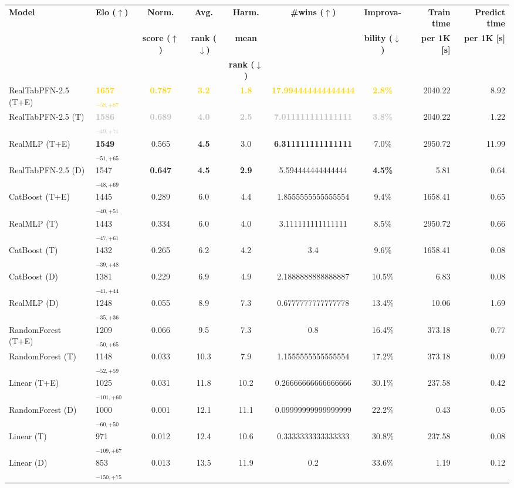 \begin{tabular}{llcccccrr}
\toprule
\textbf{Model} & \textbf{Elo ($\uparrow$)} & \textbf{Norm.} & \textbf{Avg.} & \textbf{Harm.} & \textbf{\#wins ($\uparrow$)} & \textbf{Improva-} & \textbf{Train time} & \textbf{Predict time} \\
 &  & \textbf{score ($\uparrow$)} & \textbf{rank ($\downarrow$)} & \textbf{mean} &  & \textbf{bility ($\downarrow$)} & \textbf{per 1K [s]} & \textbf{per 1K [s]} \\
 &  &  &  & \textbf{rank ($\downarrow$)} &  &  &  &  \\
\midrule
RealTabPFN-2.5 (T+E) & \textcolor{gold}{\textbf{1657${}_{-58,+87}$}} & \textcolor{gold}{\textbf{0.787}} & \textcolor{gold}{\textbf{3.2}} & \textcolor{gold}{\textbf{1.8}} & \textcolor{gold}{\textbf{17.994444444444444}} & \textcolor{gold}{\textbf{2.8\%}} & 2040.22 & 8.92 \\
RealTabPFN-2.5 (T) & \textcolor{silver}{\textbf{1586${}_{-49,+71}$}} & \textcolor{silver}{\textbf{0.689}} & \textcolor{silver}{\textbf{4.0}} & \textcolor{silver}{\textbf{2.5}} & \textcolor{silver}{\textbf{7.011111111111111}} & \textcolor{silver}{\textbf{3.8\%}} & 2040.22 & 1.22 \\
RealMLP (T+E) & \textcolor{bronze}{\textbf{1549${}_{-51,+65}$}} & 0.565 & \textcolor{bronze}{\textbf{4.5}} & 3.0 & \textcolor{bronze}{\textbf{6.311111111111111}} & 7.0\% & 2950.72 & 11.99 \\
RealTabPFN-2.5 (D) & 1547${}_{-48,+69}$ & \textcolor{bronze}{\textbf{0.647}} & \textcolor{bronze}{\textbf{4.5}} & \textcolor{bronze}{\textbf{2.9}} & 5.594444444444444 & \textcolor{bronze}{\textbf{4.5\%}} & 5.81 & 0.64 \\
CatBoost (T+E) & 1445${}_{-40,+51}$ & 0.289 & 6.0 & 4.4 & 1.8555555555555554 & 9.4\% & 1658.41 & 0.65 \\
RealMLP (T) & 1443${}_{-47,+61}$ & 0.334 & 6.0 & 4.0 & 3.111111111111111 & 8.5\% & 2950.72 & 0.66 \\
CatBoost (T) & 1432${}_{-39,+48}$ & 0.265 & 6.2 & 4.2 & 3.4 & 9.6\% & 1658.41 & 0.08 \\
CatBoost (D) & 1381${}_{-41,+44}$ & 0.229 & 6.9 & 4.9 & 2.1888888888888887 & 10.5\% & 6.83 & 0.08 \\
RealMLP (D) & 1248${}_{-35,+36}$ & 0.055 & 8.9 & 7.3 & 0.6777777777777778 & 13.4\% & 10.06 & 1.69 \\
RandomForest (T+E) & 1209${}_{-50,+65}$ & 0.066 & 9.5 & 7.3 & 0.8 & 16.4\% & 373.18 & 0.77 \\
RandomForest (T) & 1148${}_{-52,+59}$ & 0.033 & 10.3 & 7.9 & 1.1555555555555554 & 17.2\% & 373.18 & 0.09 \\
Linear (T+E) & 1025${}_{-101,+60}$ & 0.031 & 11.8 & 10.2 & 0.26666666666666666 & 30.1\% & 237.58 & 0.42 \\
RandomForest (D) & 1000${}_{-60,+50}$ & 0.001 & 12.1 & 11.1 & 0.09999999999999999 & 22.2\% & 0.43 & 0.05 \\
Linear (T) & 971${}_{-109,+67}$ & 0.012 & 12.4 & 10.6 & 0.3333333333333333 & 30.8\% & 237.58 & 0.08 \\
Linear (D) & 853${}_{-150,+75}$ & 0.013 & 13.5 & 11.9 & 0.2 & 33.6\% & 1.19 & 0.12 \\
\bottomrule
\end{tabular}